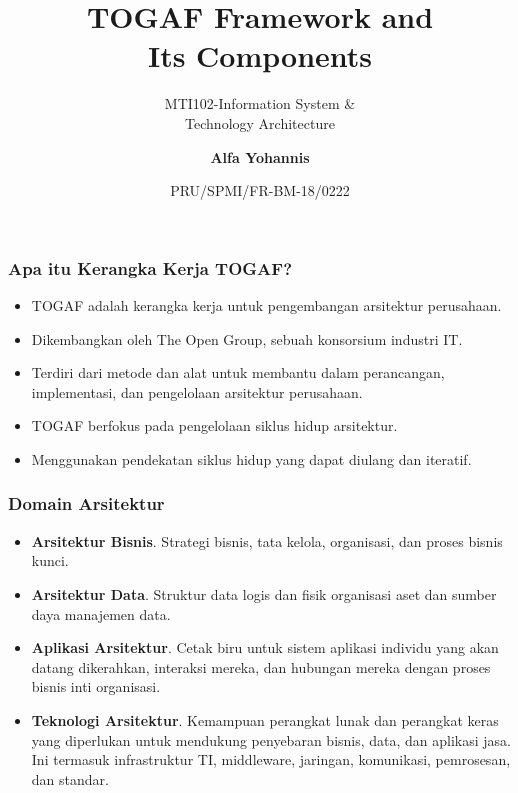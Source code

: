 \documentclass[aspectratio=169, table]{beamer}
\subtitle{MTI102-Information System \&\\Technology Architecture}
\title{TOGAF Framework and \\ Its Components}
\date[Serial]{\scriptsize {PRU/SPMI/FR-BM-18/0222}}
\author[Pradita]{\small {\textbf{Alfa Yohannis}}}
\begin{document}
	\frame{\titlepage}

	\begin{frame}
		\frametitle{Apa itu Kerangka Kerja TOGAF?}
		\begin{itemize}
			\item TOGAF adalah kerangka kerja untuk pengembangan arsitektur perusahaan.
			\item Dikembangkan oleh The Open Group, sebuah konsorsium industri IT.
			\item Terdiri dari metode dan alat untuk membantu dalam perancangan, implementasi, dan pengelolaan arsitektur perusahaan.
			\item TOGAF berfokus pada pengelolaan siklus hidup arsitektur.
			\item Menggunakan pendekatan siklus hidup yang dapat diulang dan iteratif.
		\end{itemize}
	\end{frame}

	\begin{frame}
		\frametitle{Domain Arsitektur}
		\begin{itemize}
			\item \textbf{Arsitektur Bisnis}. Strategi bisnis, tata kelola, organisasi, dan proses bisnis kunci.

			\item \textbf{Arsitektur Data}. Struktur data logis dan fisik organisasi
			aset dan sumber daya manajemen data.

			\item \textbf{Aplikasi Arsitektur}. Cetak biru untuk sistem aplikasi individu yang akan datang dikerahkan, interaksi mereka, dan hubungan mereka dengan proses bisnis inti organisasi.

			\item \textbf{Teknologi Arsitektur}. Kemampuan perangkat lunak dan perangkat keras yang diperlukan untuk mendukung penyebaran bisnis, data, dan aplikasi jasa. Ini termasuk infrastruktur TI, middleware, jaringan, komunikasi, pemrosesan, dan standar.
		\end{itemize}
	\end{frame}
\end{document}
